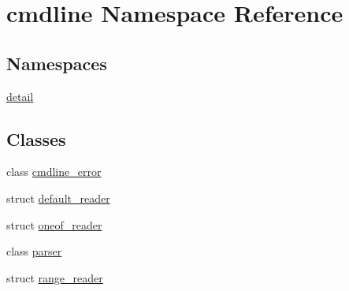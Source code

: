\hypertarget{namespacecmdline}{}\section{cmdline Namespace Reference}
\label{namespacecmdline}
\subsection*{Namespaces}
\begin{DoxyCompactItemize}
\item 
 \mbox{\hyperlink{namespacecmdline_1_1detail}{detail}}
\end{DoxyCompactItemize}
\subsection*{Classes}
\begin{DoxyCompactItemize}
\item 
class \mbox{\hyperlink{classcmdline_1_1cmdline__error}{cmdline\+\_\+error}}
\item 
struct \mbox{\hyperlink{structcmdline_1_1default__reader}{default\+\_\+reader}}
\item 
struct \mbox{\hyperlink{structcmdline_1_1oneof__reader}{oneof\+\_\+reader}}
\item 
class \mbox{\hyperlink{classcmdline_1_1parser}{parser}}
\item 
struct \mbox{\hyperlink{structcmdline_1_1range__reader}{range\+\_\+reader}}
\end{DoxyCompactItemize}
